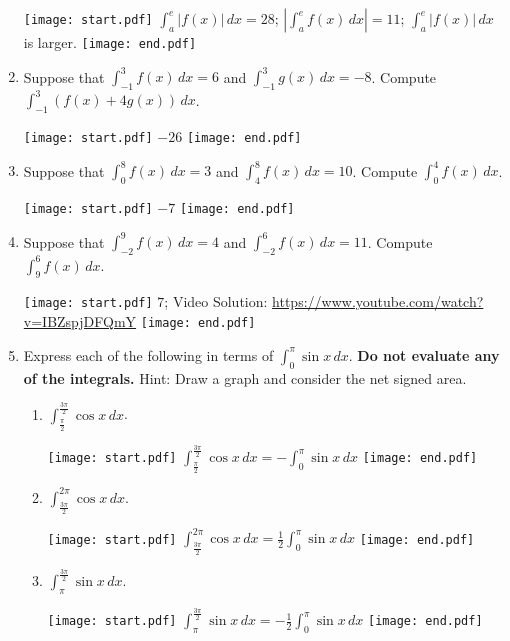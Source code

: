 \documentclass[12pt]{article}
\begin{document}
\begin{enumerate}
\texttt{[image: start.pdf]}
{{$\int_a^e|f(x)| \,dx=28$; $\left|\int_a^e{f(x)} \,dx\right|=11$; $\int_a^e{|f(x)|} \,dx$ is larger.}}
\texttt{[image: end.pdf]}


\item Suppose that $\int_{-1}^3{f(x)} \,dx=6$ and $\int_{-1}^{3}{g(x)} \,dx=-8$.  Compute $\int_{-1}^3{(f(x)+4g(x))} \,dx$.

\texttt{[image: start.pdf]}
{{$-26$}}
\texttt{[image: end.pdf]}


\item Suppose that $\int_0^8{f(x)} \,dx=3$ and $\int_4^{8}{f(x)} \,dx=10$.  Compute $\int_0^4{f(x)} \,dx$.

\texttt{[image: start.pdf]}
{{$-7$}}
\texttt{[image: end.pdf]}


\item Suppose that $\int_{-2}^9{f(x)} \,dx=4$ and $\int_{-2}^{6}{f(x)} \,dx=11$.  Compute $\int_{9}^6{f(x)} \,dx$.

\texttt{[image: start.pdf]}
{{$7$; Video Solution: \textcolor{blue}{\href{https://www.youtube.com/watch?v=IBZspjDFQmY}{https://www.youtube.com/watch?v=IBZspjDFQmY}}}}
\texttt{[image: end.pdf]}


\item Express each of the following in terms of $\int_0^{\pi}\sin{x} \,dx$.  {\bf Do not evaluate any of the integrals.}  Hint: Draw a graph and consider the net signed area.

\begin{enumerate}

\item $\int_{\frac{\pi}{2}}^{\frac{3\pi}{2}}\cos{x} \,dx$.

\texttt{[image: start.pdf]}
{{$\int_{\frac{\pi}{2}}^{\frac{3\pi}{2}}\cos{x} \,dx=-\int_0^{\pi}\sin{x} \,dx$}}
\texttt{[image: end.pdf]}


\item $\int_{\frac{3\pi}{2}}^{2\pi}\cos{x} \,dx$.

\texttt{[image: start.pdf]}
{{$\int_{\frac{3\pi}{2}}^{2\pi}\cos{x} \,dx=\frac{1}{2}\int_0^{\pi}\sin{x} \,dx$}}
\texttt{[image: end.pdf]}


\item $\int_{\pi}^{\frac{3\pi}{2}}\sin{x} \,dx$.

\texttt{[image: start.pdf]}
{{$\int_{\pi}^{\frac{3\pi}{2}}\sin{x} \,dx=-\frac{1}{2}\int_0^{\pi}\sin{x} \,dx$}}
\texttt{[image: end.pdf]}


\end{enumerate}


\end{enumerate}
\end{document}
